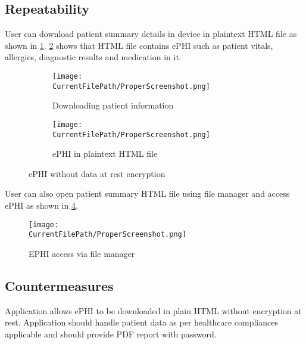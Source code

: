 
\newpage
\subsection*{Repeatability}

User can download patient summary details in device in plaintext HTML file as shown in \cref{figure:003.ephi_2.jpg}. \cref{figure:005.ephi_in_html_file} shows that HTML file contains ePHI such as patient vitals, allergies, diagnostic results and medication in it.

\begin{figure}[h]
	\begin{subfigure}{0.5\textwidth}
	\texttt{[image: \\CurrentFilePath/ProperScreenshot.png]} 
	\caption{Downloading patient information}
	\label{figure:003.ephi_2.jpg}
	\end{subfigure}
	\begin{subfigure}{0.5\textwidth}
	\texttt{[image: \\CurrentFilePath/ProperScreenshot.png]}
	\caption{ePHI in plaintext HTML file}
	\label{figure:005.ephi_in_html_file}
	\end{subfigure}
	\caption{ePHI without data at rest encryption}
	\label{fig:005.ephi_in_html_file}
\end{figure}

\newpage

User can also open patient summary HTML file using file manager and access ePHI as shown in \cref{figure:006.patient_data_file_location}.

\begin{figure}[H]
\centering
\texttt{[image: \\CurrentFilePath/ProperScreenshot.png]}
\caption{EPHI access via file manager}
\label{figure:006.patient_data_file_location}
\end{figure}




 

\subsection*{Countermeasures}

Application allows ePHI to be downloaded in plain HTML without encryption at rest. Application should handle patient data as per healthcare compliances applicable and should provide PDF report with password.


